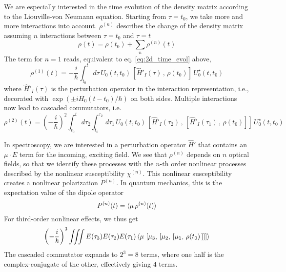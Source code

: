 We are especially interested in the time evolution of the density matrix according to the Liouville-von Neumann equation. Starting from $\tau = t_0$, we take more and more interactions into account. $\rho^{(n)}$ describes the change of the density matrix assuming $n$ interactions between $\tau = t_0$ and $\tau = t$
\begin{equation}
\rho(t) = \rho(t_0)  + \sum_n  \rho^{(n)} (t)
\end{equation}
The term for $n=1$ reads, equivalent to eq.  \ref{eq:2d_time_evol}  above,
\begin{equation}
 \rho^{(1)} (t) = - \frac{i}{\hbar} \int_{t_0}^t \, d\tau \, U_0(t, t_0) \, \left[ \hat{H}'_I(\tau) \, , \, \rho(t_0) \right] \, U_0^\star (t, t_0)
\end{equation}
where $\hat{H}'_I(\tau) $ is the perturbation operator in the interaction representation, i.e., decorated with $\exp(\pm i H_0 (t-t_0)/\hbar)$ on both sides. Multiple interactions now lead to cascaded commutators, i.e.
\begin{equation}
 \rho^{(2)} (t) = \left(- \frac{i}{\hbar}\right)^2   \int_{t_0}^t \, d\tau_2   \int_{t_0}^{\tau_2} \, d\tau_1 \, U_0(t, t_0) \, \left[ \hat{H}'_I(\tau_2) \, , \, \left[ \hat{H}'_I(\tau_1) \, , \, \rho(t_0) \right] \right] \, U_0^\star (t, t_0)
\end{equation}

In spectroscopy, we are interested in a perturbation operator $\hat{H}'$ that contains an $\mu \cdot E$ term for the incoming, exciting field. We see that $\rho^{(n)}$ depends on $n$ optical fields, so that we identify  these processes with the $n$-th order nonlinear processes described by the nonlinear susceptibility $\chi^{(n)}$. This nonlinear susceptibility creates a nonlinear polarization $P^{(n)}$. In quantum mechanics, this is the expectation value of the dipole operator 
\begin{equation}
P^{(n)} (t) = \braket{ \mu \, \rho^{(n)}(t) }
\end{equation}
For third-order nonlinear effects, we thus get
\begin{equation}
 \left(- \frac{i}{\hbar}\right)^3   \iiint E(\tau_3) E(\tau_2) E(\tau_1)
 \braket{ \mu \, 
  \left[ \mu_3 , \, \left[ \mu_2 , \, \left[ \mu_1 , \, \rho(t_0) \, \right] \right]  \right] }
  \label{eq:2d-p3-commutator}
\end{equation}
The cascaded commutator expands to $2^3=8$ terms, where one half is the complex-conjugate of the other, effectively giving $4$ terms.

